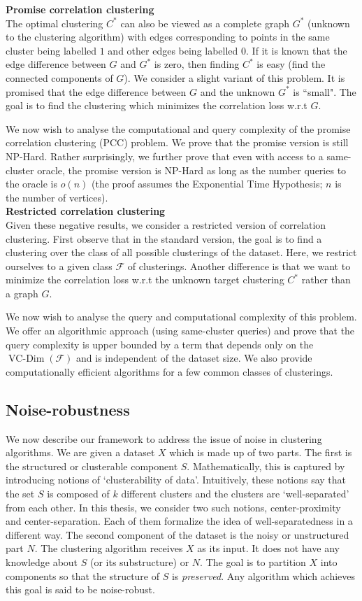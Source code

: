 \documentclass[12pt]{article}
\newcommand{\mc}{\mathcal}
\DeclareMathOperator{\vcdim}{VC-Dim}
\begin{document}
\noindent\textbf{\small Promise correlation clustering}\\
The optimal clustering $C^*$ can also be viewed as a complete graph $G^*$ (unknown to the clustering algorithm) with edges corresponding to points in the same cluster being labelled $1$ and other edges being labelled $0$. If it is known that the edge difference between $G$ and $G^*$ is zero, then finding $C^*$ is easy (find the connected components of $G$). We consider a slight variant of this problem. It is promised that the edge difference between $G$ and the unknown $G^*$ is ``small". The goal is to find the clustering which minimizes the correlation loss w.r.t $G$.

We now wish to analyse the computational and query complexity of the promise correlation clustering (PCC) problem. We prove that the promise version is still NP-Hard. Rather surprisingly, we further prove that even with access to a same-cluster oracle, the promise version is NP-Hard as long as the number queries to the oracle is $o(n)$ (the proof assumes the Exponential Time Hypothesis; $n$ is the number of vertices). \\

\noindent\textbf{\small Restricted correlation clustering}\\
Given these negative results, we consider a restricted version of correlation clustering. First observe that in the standard version, the goal is to find a clustering over the class of all possible clusterings of the dataset. Here, we restrict ourselves to a given class $\mc F$ of clusterings. Another difference is that we want to minimize the correlation loss w.r.t the unknown target clustering $C^*$ rather than a graph $G$. 

We now wish to analyse the query and computational complexity of this problem. We offer an algorithmic approach (using same-cluster queries) and prove that the query complexity is upper bounded by a term that depends only on the $\vcdim(\mc F)$ and is independent of the dataset size. We also provide computationally efficient algorithms for a few common classes of clusterings. 
 
\subsection{Noise-robustness}
We now describe our framework to address the issue of noise in clustering algorithms. We are given a dataset $X$ which is made up of two parts. The first is the structured or clusterable component $S$. Mathematically, this is captured by introducing notions of `clusterability of data'. Intuitively, these notions say that the set $S$ is composed of $k$ different clusters and the clusters are `well-separated' from each other. In this thesis, we consider two such notions, center-proximity and center-separation. Each of them formalize the idea of well-separatedness in a different way. The second component of the dataset is the noisy or unstructured part $N$. The clustering algorithm receives $X$ as its input. It does not have any knowledge about $S$ (or its substructure) or $N$. The goal is to partition $X$ into components so that the structure of $S$ is \textit{preserved}. Any algorithm which achieves this goal is said to be noise-robust. 
\end{document}

